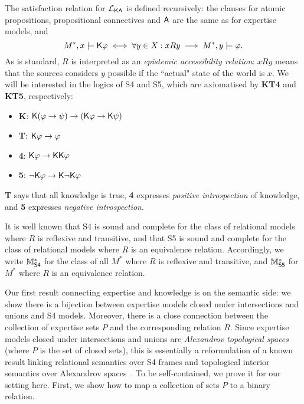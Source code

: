 The satisfaction relation for $\mathcal{L}_{\mathsf{K}\mathsf{A}}$ is defined recursively: the clauses
for atomic propositions, propositional connectives and $\mathsf{A}$ are the same
as for expertise models, and
\[
    M^*, x \models \mathsf{K}\varphi
    \iff
    \forall y \in X: xRy \implies M^*, y \models \varphi.
\]
As is standard, $R$ is interpreted as an \emph{epistemic accessibility relation}:
$xRy$ means that the sources considers $y$ possible if the ``actual"
state of the world is $x$. We will be interested in the logics of S4 and
S5, which are axiomatised by \textbf{KT4} and \textbf{KT5}, respectively:

\begin{itemize}
    \item \textbf{K}: $\mathsf{K}(\varphi \to \psi) \to (\mathsf{K}\varphi \to
          \mathsf{K}\psi)$

    \item \textbf{T}: $\mathsf{K}\varphi \to \varphi$

    \item \textbf{4}: $\mathsf{K}\varphi \to \mathsf{K}\mathsf{K}\varphi$

    \item \textbf{5}: $\neg\mathsf{K}\varphi \to \mathsf{K}\neg\mathsf{K}\varphi$

\end{itemize}

\textbf{T} says that all knowledge is true, \textbf{4} expresses \emph{positive
introspection} of knowledge, and \textbf{5} expresses \emph{negative
introspection}.

It is well known that S4 is sound and complete for the class of relational
models where $R$ is reflexive and transitive, and that S5 is sound and complete
for the class of relational models where $R$ is an equivalence relation.
Accordingly, we write $\mathbb{M}^*_{\mathsf{S4}}$ for the class of all $M^*$ where $R$ is
reflexive and transitive, and $\mathbb{M}^*_{\mathsf{S5}}$ for $M^*$ where $R$ is an equivalence
relation.

Our first result connecting expertise and knowledge is on the semantic side: we
show there is a bijection between expertise models closed under intersections
and unions and S4 models. Moreover, there is a close connection between the
collection of expertise sets $P$ and the corresponding relation $R$.
Since expertise models closed under intersections and unions
are \emph{Alexandrov topological spaces} (where $P$ is the set of closed sets),
this is essentially a reformulation of a known result linking relational
semantics over S4 frames and topological interior semantics over Alexandrov
spaces~\cite{van2007modal,ozgun_evidence}.\footnotemark{} To be self-contained,
we prove it for our setting here. First, we show how to map a collection of
sets $P$ to a binary relation.

